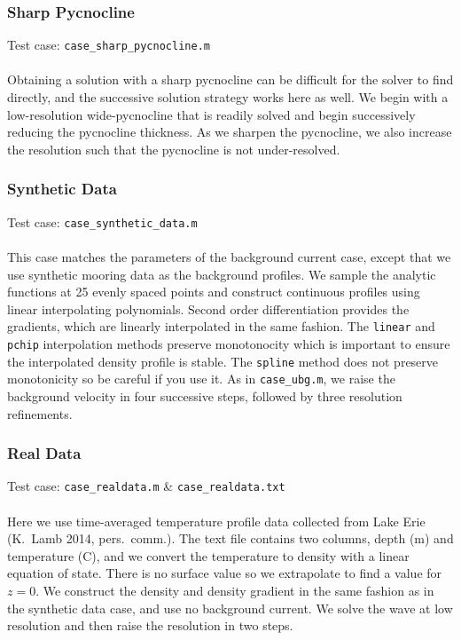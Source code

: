 \documentclass[letterpaper]{article}
\begin{document}
\subsubsection{Sharp Pycnocline}
Test case: \verb"case_sharp_pycnocline.m" \\\\
Obtaining a solution with a sharp pycnocline can be difficult for the solver to find directly, and the successive solution strategy works here as well.
We begin with a low-resolution wide-pycnocline that is readily solved and begin successively reducing the pycnocline thickness.
As we sharpen the pycnocline, we also increase the resolution such that the pycnocline is not under-resolved.

\subsubsection{Synthetic Data}
Test case: \verb"case_synthetic_data.m" \\\\
This case matches the parameters of the background current case, except that we use synthetic mooring data as the background profiles.
We sample the analytic functions at 25 evenly spaced points and construct continuous profiles using linear interpolating polynomials.
Second order differentiation provides the gradients, which are linearly interpolated in the same fashion.
The \verb+linear+ and \verb+pchip+ interpolation methods preserve monotonocity which is important to ensure the interpolated density profile is stable.
The \verb+spline+ method does not preserve monotonicity so be careful if you use it.
As in \verb"case_ubg.m", we raise the background velocity in four successive steps, followed by three resolution refinements.

\subsubsection{Real Data}
Test case: \verb"case_realdata.m" \&  \verb"case_realdata.txt" \\\\
Here we use time-averaged temperature profile data collected from Lake Erie (K.~Lamb 2014, pers.~comm.).
The text file contains two columns, depth (m) and temperature (\textdegree C), and we convert the temperature to density with a linear equation of state.
There is no surface value so we extrapolate to find a value for $z=0$.
We construct the density and density gradient in the same fashion as in the synthetic data case, and use no background current.
We solve the wave at low resolution and then raise the resolution in two steps.
\end{document}
